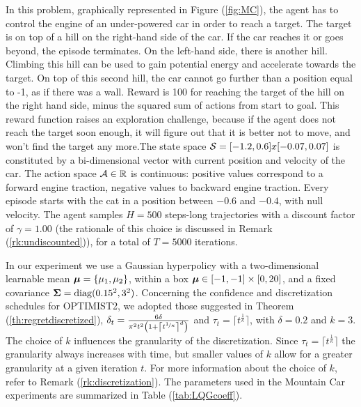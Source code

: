 In this problem, graphically represented in Figure (\ref{fig:MC}), the agent has to control the engine of an under-powered car in order to reach a target. The target is on top of a hill on the right-hand side of the car. If the car reaches it or goes beyond, the episode terminates. On the left-hand side, there is another hill. Climbing this hill can be used to gain potential energy and accelerate towards the target. On top of this second hill, the car cannot go further than a position equal to -1, as if there was a wall. Reward is 100 for reaching the target of the hill on the right hand side, minus the squared sum of actions from start to goal. This reward function raises an exploration challenge, because if the agent does not reach the target soon enough, it will figure out that it is better not to move, and won't find the target any more.The state space $\mathcal{S}=[-1.2,0.6]x[-0.07,0.07]$ is constituted by a bi-dimensional vector with current position and velocity of the car. The action space $\mathcal{A}\in\mathbb{R}$ is continuous: positive values correspond to a forward engine traction, negative values to backward engine traction. Every episode starts with the cat in a position between $-0.6$ and $-0.4$, with null velocity. The agent samples $H=500$ steps-long trajectories with a discount factor of $\gamma=1.00$ (the rationale of this choice is discussed in Remark (\ref{rk:undiscounted})), for a total of $T=5000$ iterations. 

In our experiment we use a Gaussian hyperpolicy with a two-dimensional learnable mean $\boldsymbol{\mu}=\{\mu_1, \mu_2\}$, within a box $\boldsymbol{\mu}\in[-1,-1]\times[0,20]$, and a fixed covariance $\boldsymbol{\Sigma}=\mathrm{diag}(0.15^2,3^2)$. Concerning the confidence and discretization schedules for \gls{OPTIMIST}2, we adopted those suggested in Theorem (\ref{th:regretdiscretized}), \ie ${\delta_t = \frac{6\delta}{\pi^2t^2\left(1+\left\lceil t^{\nicefrac{1}{\kappa}}\right\rceil^d\right)}}$ and $\tau_t=\lceil t^{\frac{1}{\kappa}} \rceil$, with $\delta=0.2$ and $k=3$. The choice of $k$ influences the granularity of the discretization. Since $\tau_t=\lceil t^{\frac{1}{\kappa}} \rceil$ the granularity always increases with time, but smaller values of $k$ allow for a greater granularity at a given iteration $t$. For more information about the choice of $k$, refer to Remark (\ref{rk:discretization}). The parameters used in the Mountain Car experiments are summarized in Table (\ref{tab:LQGcoeff}).

